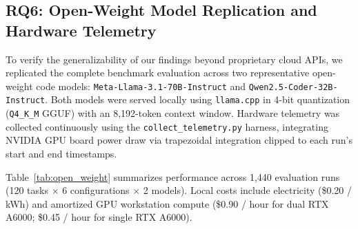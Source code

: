 \subsection{RQ6: Open-Weight Model Replication and Hardware Telemetry}
To verify the generalizability of our findings beyond proprietary cloud APIs, we replicated the complete benchmark evaluation across two representative open-weight code models: \texttt{Meta-Llama-3.1-70B-Instruct} and \texttt{Qwen2.5-Coder-32B-Instruct}. Both models were served locally using \texttt{llama.cpp} in 4-bit quantization (\texttt{Q4\_K\_M} GGUF) with an 8,192-token context window. Hardware telemetry was collected continuously using the \texttt{collect\_telemetry.py} harness, integrating NVIDIA GPU board power draw via trapezoidal integration clipped to each run's start and end timestamps.

Table~\ref{tab:open_weight} summarizes performance across 1,440 evaluation runs (120 tasks $\times$ 6 configurations $\times$ 2 models). Local costs include electricity (\$0.20 / kWh) and amortized GPU workstation compute (\$0.90 / hour for dual RTX A6000; \$0.45 / hour for single RTX A6000).

